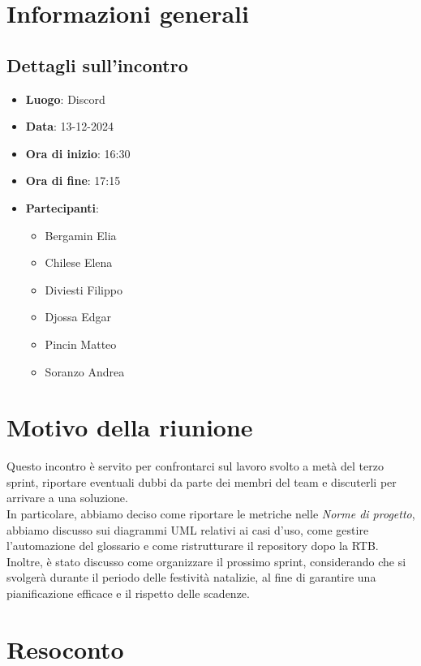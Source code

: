\section{Informazioni generali}
\subsection{Dettagli sull'incontro}
\begin{itemize}
    \item \textbf{Luogo}: Discord
    \item \textbf{Data}: 13-12-2024
    \item \textbf{Ora di inizio}: 16:30
    \item \textbf{Ora di fine}: 17:15
    \item \textbf{Partecipanti}:
    \begin{itemize}
        \item Bergamin Elia
        \item Chilese Elena
        \item Diviesti Filippo
        \item Djossa Edgar
        \item Pincin Matteo 
        \item Soranzo Andrea  
    \end{itemize}
\end{itemize}

\section{Motivo della riunione}
Questo incontro è servito per confrontarci sul lavoro svolto a metà del terzo sprint, riportare eventuali dubbi da parte dei membri del team 
e discuterli per arrivare a una soluzione.\\
In particolare, abbiamo deciso come riportare le metriche nelle \textit{Norme di progetto}, abbiamo discusso sui diagrammi UML relativi ai casi d'uso, come gestire l'automazione del glossario e come ristrutturare il repository dopo la RTB.
\\Inoltre, è stato discusso come organizzare il prossimo sprint, considerando che si svolgerà durante il periodo delle festività natalizie, al fine di garantire una pianificazione efficace e il rispetto delle scadenze.

\section{Resoconto}
